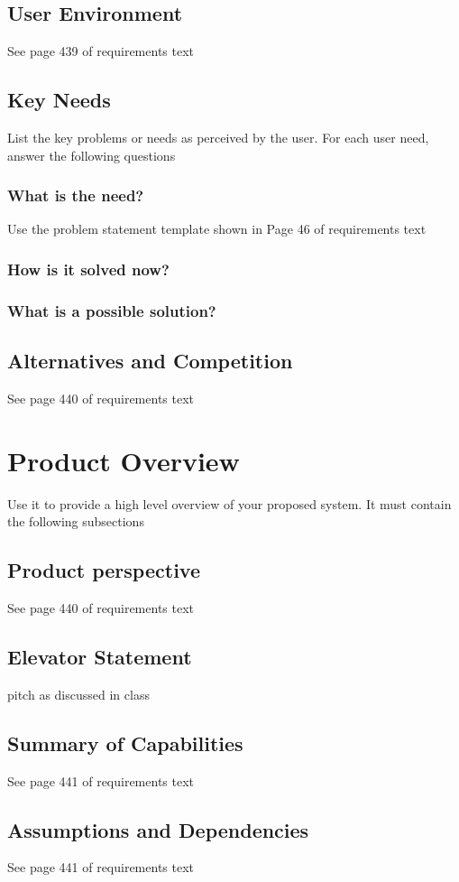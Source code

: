\documentclass{article}
\begin{document}
\subsection{User Environment}
See page 439 of requirements text
\subsection{Key Needs}
List the key problems or needs as perceived by the user. For each user need, answer the following questions
\subsubsection{What is the need?}
Use the problem statement template shown in Page 46 of requirements text
\subsubsection{How is it solved now?}
\subsubsection{What is a possible solution?}
\subsection{Alternatives and Competition}
See page 440 of requirements text
\section{Product Overview}
Use it to provide a high level overview of your proposed system. It must contain the following subsections
\subsection{Product perspective}
See page 440 of requirements text
\subsection{Elevator Statement}
pitch as discussed in class
\subsection{Summary of Capabilities}
See page 441 of requirements text
\subsection{Assumptions and Dependencies}
See page 441 of requirements text
\end{document}
